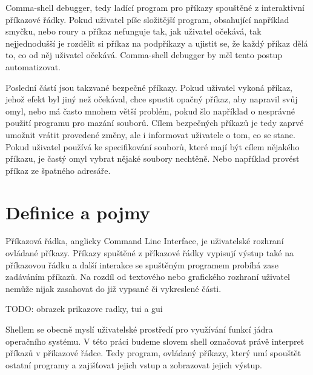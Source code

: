 \documentclass[thesis=M,czech]{FITthesis}[2012/06/26]
\begin{document}
\begin{introduction}
Comma-shell debugger, tedy ladící program pro příkazy spouštěné z interaktivní příkazové řádky. Pokud uživatel píše složitější program, obsahující například smyčku, nebo roury a příkaz nefunguje tak, jak uživatel očekává, tak nejjednodušší je rozdělit si příkaz na podpříkazy a ujistit se, že každý příkaz dělá to, co od něj uživatel očekává. Comma-shell debugger by měl tento postup automatizovat.

Poslední částí jsou takzvané bezpečné příkazy. Pokud uživatel vykoná příkaz, jehož efekt byl jiný než očekával, chce spustit opačný příkaz, aby napravil svůj omyl, nebo má často mnohem větší problém, pokud šlo například o nesprávné použití programu pro mazání souborů. Cílem bezpečných příkazů je tedy zaprvé umožnit vrátit provedené změny, ale i informovat uživatele o tom, co se stane. Pokud uživatel používá ke specifikování souborů, které mají být cílem nějakého příkazu, je častý omyl vybrat nějaké soubory nechtěně. Nebo například provést příkaz ze špatného adresáře.





\end{introduction}

\chapter{Definice a pojmy}

Příkazová řádka, anglicky Command Line Interface, je uživatelské rozhraní ovládané příkazy. Příkazy spuštěné z příkazové řádky vypisují výstup také na příkazovou řádku a další interakce se spuštěným programem probíhá zase zadáváním příkazů. Na rozdíl od textového nebo grafického rozhraní uživatel nemůže nijak zasahovat do již vypsané či vykreslené části.

TODO: obrazek prikazove radky, tui a gui

Shellem se obecně myslí uživatelské prostředí pro využívání funkcí jádra operačního systému. V této práci budeme slovem shell označovat právě interpret příkazů v příkazové řádce. Tedy program, ovládaný příkazy, který umí spouštět ostatní programy a zajišťovat jejich vstup a zobrazovat jejich výstup.
\end{document}

